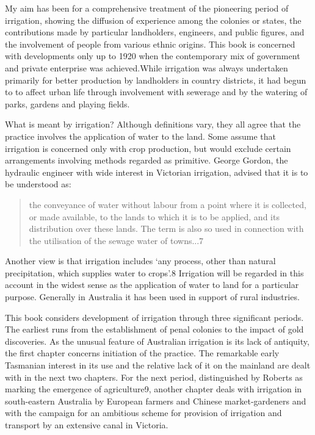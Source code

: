 My aim has been for a comprehensive treatment of the pioneering period
of irrigation, showing the diffusion of experience among the colonies
or states, the contributions made by particular landholders,
engineers, and public figures, and the involvement of people from
various ethnic origins. This book is concerned with developments only
up to 1920 when the contemporary mix of government and private
enterprise was achieved.While irrigation was always undertaken
primarily for better production by landholders in country districts,
it had begun to to affect urban life through involvement with sewerage
and by the watering of parks, gardens and playing fields.

What is meant by irrigation? Although definitions vary, they all agree
that the practice involves the application of water to the land. Some
assume that irrigation is concerned only with crop production, but
would exclude certain arrangements involving methods regarded as
primitive. George Gordon, the hydraulic engineer with wide interest in
Victorian irrigation, advised that it is to be understood as:
\begin{quote}
	the conveyance of water without labour from a point where it
	is collected, or made available, to the lands to which it is
	to be applied, and its distribution over these lands. The term
	is also so used in connection with the utilisation of the
	sewage water of towns...7
\end{quote}
Another view is that irrigation includes `any process, other than
natural precipitation, which supplies water to crops'.8 Irrigation
will be regarded in this account in the widest sense as the
application of water to land for a particular purpose. Generally in
Australia it has been used in support of rural industries.

This book considers development of irrigation through three
significant periods. The earliest runs from the establishment of penal
colonies to the impact of gold discoveries. As the unusual feature of
Australian irrigation is its lack of antiquity, the first chapter
concerns initiation of the practice. The remarkable early Tasmanian
interest in its use and the relative lack of it on the mainland are
dealt with in the next two chapters. For the next period,
distinguished by Roberts as marking the emergence of agriculture9,
another chapter deals with irrigation in south-eastern Australia by
European farmers and Chinese market-gardeners and with the campaign
for an ambitious scheme for provision of irrigation and transport by
an extensive canal in Victoria.

